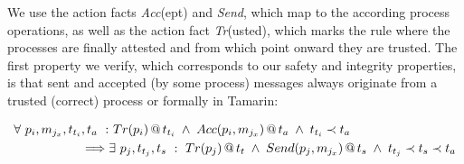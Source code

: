 We use the action facts \textit{Acc}(ept) and \textit{Send}, which map to the according process operations, as well as the action fact \textit{Tr}(usted), which marks the rule where the processes are finally attested and from which point onward they are trusted. The first property we verify, which corresponds to our safety and integrity properties, is that sent and accepted (by some process) messages always originate from a trusted (correct) process or formally in Tamarin:

\begingroup
\setlength{\abovedisplayskip}{0.0em} %
\setlength{\belowdisplayskip}{0.4em} %
\setlength{\jot}{0.1em} %

\begin{equation}
    \begin{split}
    \forall~ p_i, m_{j_x}, t_{t_i}, t_a ~:&~ Tr(p_i) \,@\,{} t_{t_i} \;\wedge\; Acc(p_i, m_{j_x}) \,@\,{} t_a \;\wedge\; t_{t_i} \prec t_a \\
    \implies & \exists~ p_j,  t_{t_j}, t_s ~:~ Tr(p_j) \,@\,{} t_t \;\wedge\; Send(p_j, m_{j_x}) \,@\,{} t_s \;\wedge\; t_{t_j} \prec t_s \prec t_a
    \end{split}
\end{equation}
\endgroup




